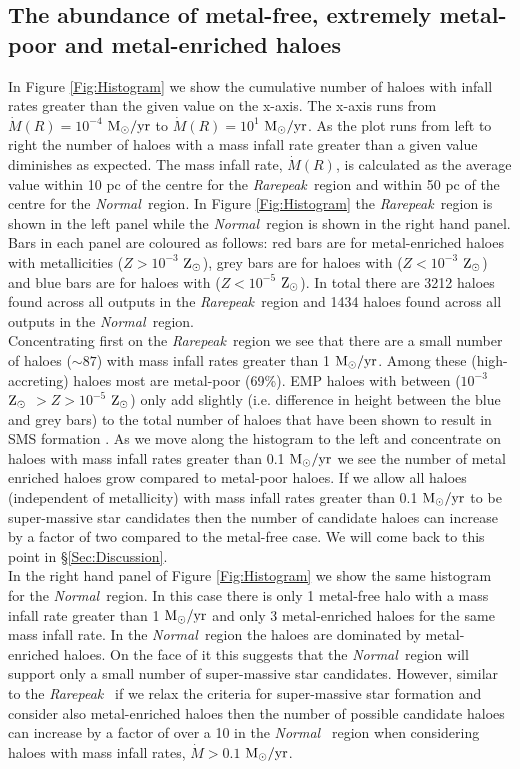 \documentclass[graphics, twocolumn, usenatbib]{mn2e}
\newcommand{\msolaryr} {$\rm{M_{\odot}/yr}~$}
\newcommand{\msolaryrc} {$\rm{M_{\odot}/yr}$}
\newcommand{\zsolar} {$\rm{Z_{\odot}}~$}
\newcommand{\zsolarc} {$\rm{Z_{\odot}}$}
\newcommand{\rarepeak} {\textit{Rarepeak~}}
\newcommand{\normal} {\textit{Normal~}}
\begin{document}
\subsection{The abundance of metal-free, extremely metal-poor and metal-enriched haloes}
In Figure \ref{Fig:Histogram} we show the cumulative number of haloes with infall rates greater than
the given value on the x-axis. The x-axis runs from $\dot{M}(R) = 10^{-4}$ \msolaryr to 
$\dot{M}(R) = 10^{1}$ \msolaryrc. As the plot runs from left to right the number of haloes with a
mass infall rate greater than a given value diminishes as expected. The mass infall rate,
$\dot{M}(R)$, is calculated as the average value within 10 pc of the centre for the \rarepeak region
and within 50 pc of the centre for the \normal region. In Figure  \ref{Fig:Histogram} the
\rarepeak region is shown in the left panel while the \normal region is shown in the right hand
panel. Bars in each panel are coloured as follows: red bars are for metal-enriched haloes with
metallicities ($Z > 10^{-3}$ \zsolarc), grey bars are for haloes with ($Z < 10^{-3}$ \zsolarc) and
blue bars are for haloes with ($Z < 10^{-5}$ \zsolarc). In total there are 3212 haloes found
across all outputs in the \rarepeak region and 1434 haloes found across all outputs in the
\normal region. \\
\indent Concentrating first on the \rarepeak region we see that there are a small number of
haloes ($\sim 87$) with mass infall rates greater than 1 \msolaryrc. Among these (high-accreting)
haloes most are metal-poor (69\%). EMP haloes with between
($10^{-3}$ \zsolar $> Z > 10^{-5}$ \zsolarc) only add slightly (i.e. difference in height between the
blue and grey bars) to the total number of haloes that
have been shown to result in SMS formation \citep{Chon_2020}. As we move along the histogram to the
left and concentrate on haloes with mass infall rates greater than 0.1 \msolaryr we see the
number of metal enriched haloes grow compared to
metal-poor haloes. If we allow all haloes (independent of metallicity) with mass infall rates greater
than  0.1 \msolaryr to be super-massive star candidates then the number of candidate haloes can
increase by a factor of two compared to the metal-free case. We will
come back to this point in \S \ref{Sec:Discussion}. \\
\indent In the right hand panel of Figure \ref{Fig:Histogram}
we show the same histogram for the \normal region. In this case there is only 1 metal-free halo
with a mass infall rate greater than 1 \msolaryr and only 3 metal-enriched haloes for the
same mass infall rate. In the \normal region the haloes are dominated by metal-enriched haloes.
On the face of it this suggests that the \normal region will
support only a small number of super-massive star candidates. However, similar to the \rarepeak
if we relax the criteria for super-massive star formation and consider also metal-enriched haloes
then the number of possible candidate haloes can increase by a factor of over a 10 in the \normal
region when considering haloes with mass infall rates, $\dot{M} > 0.1 $ \msolaryrc. 
\end{document}
